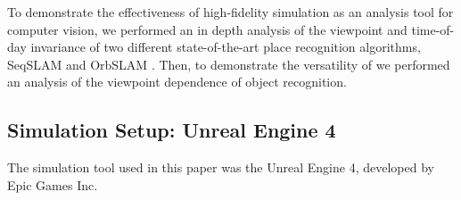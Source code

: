 \documentclass[letterpaper, 10 pt, conference]{ieeeconf}  %
\begin{document}
%
%
%

To demonstrate the effectiveness of high-fidelity simulation as an analysis tool for computer vision, we performed an in depth analysis of the viewpoint and time-of-day invariance of two different state-of-the-art place recognition algorithms, SeqSLAM \cite{Milford2012} and OrbSLAM \cite{Montiel2015}. Then, to demonstrate the versatility of we performed an analysis of the viewpoint dependence of object recognition.

\subsection{Simulation Setup: Unreal Engine 4}

The simulation tool used in this paper was the Unreal Engine 4, developed by Epic Games Inc.
\end{document}
